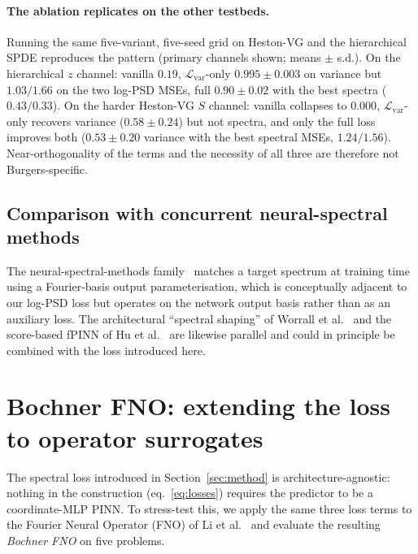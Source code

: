 \documentclass[review,12pt]{elsarticle}
\begin{document}
\paragraph{The ablation replicates on the other testbeds.} Running the
same five-variant, five-seed grid on Heston-VG and the hierarchical SPDE
reproduces the pattern (primary channels shown; means $\pm$ s.d.). On the
hierarchical $z$ channel: vanilla $0.19$, $\mathcal{L}_{\mathrm{var}}$-only
$0.995 \pm 0.003$ on variance but $1.03/1.66$ on the two log-PSD MSEs,
full $0.90 \pm 0.02$ with the best spectra ($0.43/0.33$). On the harder
Heston-VG $S$ channel: vanilla collapses to $0.000$,
$\mathcal{L}_{\mathrm{var}}$-only recovers variance ($0.58 \pm 0.24$) but
not spectra, and only the full loss improves both
($0.53 \pm 0.20$ variance with the best spectral MSEs, $1.24/1.56$).
Near-orthogonality of the terms and the necessity of all three are
therefore not Burgers-specific.


\subsection{Comparison with concurrent neural-spectral methods}
\label{subsec:concurrent}

The neural-spectral-methods family~\cite{DuEtAl2024NSM} matches a
target spectrum at training time using a Fourier-basis output
parameterisation, which is conceptually adjacent to our log-PSD
loss but operates on the network output basis rather than as an
auxiliary loss. The
architectural ``spectral shaping'' of Worrall et
al.~\cite{Worrall2025SpectralShaping} and the score-based fPINN
of Hu et al.~\cite{Hu2024ScoreFPINN} are likewise parallel and
could in principle be combined with the loss introduced here.


\section{Bochner FNO: extending the loss to operator surrogates}
\label{sec:spectral-fno}

The spectral loss introduced in Section~\ref{sec:method} is
architecture-agnostic: nothing in the construction
(eq.~\ref{eq:losses}) requires the predictor to be a coordinate-MLP
PINN. To stress-test this, we apply the same three loss terms to
the Fourier Neural Operator (FNO) of Li et al.~\cite{Li2021FNO}
and evaluate the resulting \emph{Bochner FNO} on five problems.
\end{document}
